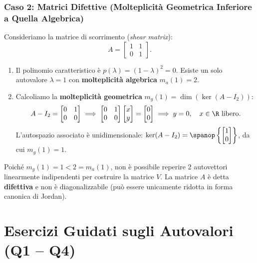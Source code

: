 \subsubsection{Caso 2: Matrici Difettive (Molteplicit\`a Geometrica Inferiore a Quella Algebrica)}
Consideriamo la matrice di scorrimento (\textit{shear matrix}):
\begin{equation}
    A = \begin{bmatrix} 1 & 1 \\ 0 & 1 \end{bmatrix}.
\end{equation}
\begin{enumerate}
    \item Il polinomio caratteristico \`e $p(\lambda) = (1-\lambda)^2 = 0$. Esiste un solo autovalore $\lambda = 1$ con \textbf{molteplicit\`a algebrica} $m_a(1) = 2$.
    \item Calcoliamo la \textbf{molteplicit\`a geometrica} $m_g(1) = \dim(\ker(A - I_2))$:
    \begin{equation}
        A - I_2 = \begin{bmatrix} 0 & 1 \\ 0 & 0 \end{bmatrix} \implies \begin{bmatrix} 0 & 1 \\ 0 & 0 \end{bmatrix} \begin{bmatrix} x \\ y \end{bmatrix} = \begin{bmatrix} 0 \\ 0 \end{bmatrix} \implies y = 0, \quad x \in \R \text{ libero}.
    \end{equation}
    L'autospazio associato \`e unidimensionale: $\ker(A - I_2) = \spanop\left\{\begin{bmatrix} 1 \\ 0 \end{bmatrix}\right\}$, da cui $m_g(1) = 1$.
\end{enumerate}
Poich\'e $m_g(1) = 1 < 2 = m_a(1)$, non \`e possibile reperire 2 autovettori linearmente indipendenti per costruire la matrice $V$. La matrice $A$ \`e detta \textbf{difettiva} e non \`e diagonalizzabile (pu\`o essere unicamente ridotta in forma canonica di Jordan).

\FloatBarrier
\section{Esercizi Guidati sugli Autovalori (Q1 -- Q4)}

